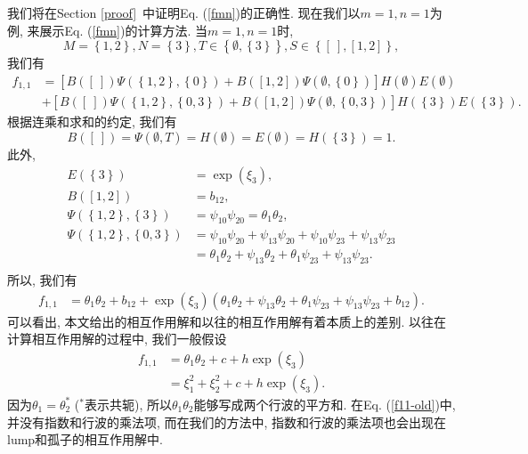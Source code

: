 \documentclass[12pt,a4paper,UTF8]{article}
\numberwithin{equation}{section}
\newcommand{\sbrace}[1]{\left(#1\right)}
\newcommand{\mbrace}[1]{\left[#1\right]}
\newcommand{\bbrace}[1]{\left\{#1\right\}}
\newcommand{\refeqn}[1]{Eq. (\ref{#1})}
\newcommand{\refsec}[1]{Section \ref{#1}~}
\begin{document}
我们将在\refsec{proof}中证明\refeqn{fmn}的正确性. 现在我们以$m=1,n=1$为例, 来展示\refeqn{fmn}的计算方法. 当$m=1,n=1$时, 
\begin{equation}
M=\bbrace{1,2},N=\bbrace{3},
T\in\bbrace{\emptyset,\bbrace{3}}, 
S\in\bbrace{[~],[1,2]},
\end{equation}
我们有 
\begin{equation}
\begin{aligned}
f_{1,1}&=\mbrace{B([~])\Psi(\bbrace{1,2},\bbrace{0})+B([1,2])\Psi(\emptyset,\bbrace{0})}H(\emptyset)E(\emptyset) \\ 
&+\mbrace{B([~])\Psi(\bbrace{1,2},\bbrace{0,3})+B([1,2])\Psi(\emptyset,\bbrace{0,3})}H(\bbrace{3})E(\bbrace{3}).
\end{aligned}
\end{equation}
根据连乘和求和的约定, 我们有
\begin{equation}
  B([~])=\Psi(\emptyset,T)=H(\emptyset)=E(\emptyset)=H(\bbrace{3})=1. 
\end{equation}
此外, 
\begin{equation}
\begin{aligned}
E(\bbrace{3})&=\exp(\xi_3), \\ 
B([1,2])&=b_{12}, \\
\Psi(\bbrace{1,2},\bbrace{3})&=\psi_{10}\psi_{20}=\theta_1 \theta_2,\\ 
\Psi(\bbrace{1,2},\bbrace{0,3})&=\psi_{10}\psi_{20}+\psi_{13}\psi_{20}+\psi_{10}\psi_{23}+\psi_{13}\psi_{23} \\
&=\theta_1\theta_2+\psi_{13}\theta_2+\theta_1\psi_{23}+\psi_{13}\psi_{23}.\\ 
\end{aligned}
\end{equation}
所以, 我们有
\begin{equation}
\begin{aligned}
f_{1,1}&=\theta_1 \theta_2+b_{12}+\exp(\xi_3)\sbrace{\theta_1\theta_2+\psi_{13}\theta_2+\theta_1\psi_{23}+\psi_{13}\psi_{23}+b_{12}}. 
\end{aligned}
\label{f11-new}
\end{equation}
可以看出, 本文给出的相互作用解和以往的相互作用解有着本质上的差别. 以往在计算相互作用解的过程中, 我们一般假设
\begin{equation}
\begin{aligned}
f_{1,1}&=\theta_1 \theta_2+c+h \exp(\xi_3) \\ 
&=\xi_1^2+\xi_2^2+c+h \exp(\xi_3) . 
\end{aligned}
\label{f11-old}
\end{equation}
因为$\theta_1=\theta_2^*$ ($^*$表示共轭), 所以$\theta_1 \theta_2$能够写成两个行波的平方和. 在\refeqn{f11-old}中, 并没有指数和行波的乘法项, 而在我们的方法中, 指数和行波的乘法项也会出现在lump和孤子的相互作用解中. 
\end{document}
